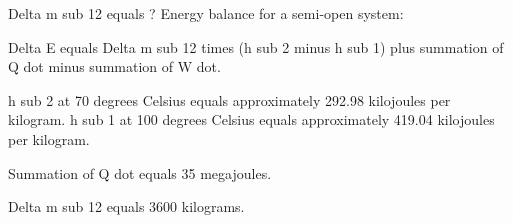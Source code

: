 Delta m sub 12 equals ?  
Energy balance for a semi-open system:  

Delta E equals Delta m sub 12 times (h sub 2 minus h sub 1) plus summation of Q dot minus summation of W dot.  

h sub 2 at 70 degrees Celsius equals approximately 292.98 kilojoules per kilogram.  
h sub 1 at 100 degrees Celsius equals approximately 419.04 kilojoules per kilogram.  

Summation of Q dot equals 35 megajoules.  

Delta m sub 12 equals 3600 kilograms.